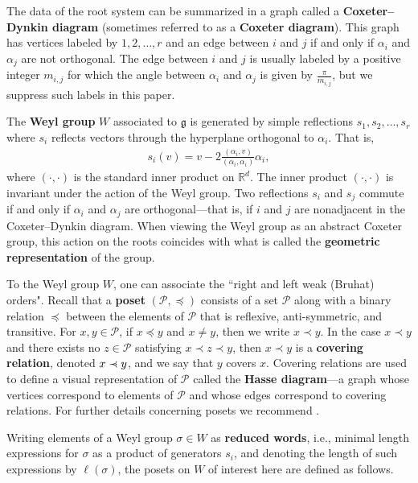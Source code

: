 \documentclass{amsart}
\theoremstyle{definition}
\newcommand*{\R}{\mathbb{R}}
\newcommand{\defn}[1]{\textbf{#1}}
\newcommand{\precdot}{\prec\mathrel{\mkern-5mu}\mathrel{\cdot}}
\begin{document}
The data of the root system can be summarized in a graph called a \defn{Coxeter--Dynkin diagram} (sometimes referred to as a \textbf{Coxeter diagram}). 
This graph has vertices labeled by $1,2,\ldots, r$ and an edge between $i$ and $j$ if and only if $\alpha_i$ and $\alpha_j$ are not orthogonal. The edge between $i$ and $j$ is usually labeled by a positive integer $m_{i,j}$ for which the angle between $\alpha_i$ and $\alpha_j$ is given by $\frac{\pi}{m_{i,j}}$, but we suppress such labels in this paper.

The \textbf{Weyl group} $W$ associated to $\mathfrak{g}$ is generated by simple reflections $s_1, s_2,\ldots,s_r$ where $s_i$ reflects vectors through the hyperplane orthogonal to $\alpha_i$. 
That is, \begin{align*}
    s_i(v)=v-2\frac{(\alpha_i,v)}{(\alpha_i,\alpha_i)}\alpha_i,
\end{align*} where $(\cdot,\cdot)$ is the standard inner product on $\R^d$. 
The inner product $(\cdot,\cdot)$ is invariant under the action of the Weyl group.
Two reflections $s_i$ and $s_j$ commute if and only if $\alpha_i$ and $\alpha_j$ are orthogonal---that is, if $i$ and $j$ are nonadjacent in the Coxeter--Dynkin diagram. 
When viewing the Weyl group as an abstract Coxeter group, this action on the roots coincides with what is called the \defn{geometric representation} of the group. 


To the Weyl group $W$, one can associate the ``right and left weak (Bruhat) orders".
Recall that a \defn{poset} $(\mathcal{P},\preceq)$ consists of a set $\mathcal{P}$ along with a binary relation $\preceq$ between the elements of $\mathcal{P}$ that is 
reflexive, anti-symmetric, and transitive. 
For $x,y\in\mathcal{P}$, if $x\preceq y$ and $x\neq y$, then we write $x\prec y$. 
In the case $x\prec y$ and there exists no $z\in \mathcal{P}$ satisfying $x\prec z\prec y$, then $x\prec y$ is a \defn{covering relation}, denoted $x\precdot y$, and we say that $y$ covers $x$. Covering relations are used to define a visual representation of $\mathcal{P}$ called the \defn{Hasse diagram}---a graph whose vertices correspond to elements of $\mathcal{P}$ and whose edges correspond to covering relations. For further details concerning posets we recommend \cite{EC1}. 

Writing elements of a Weyl group $\sigma\in W$ as \defn{reduced words}, i.e., minimal length expressions for $\sigma$ as a product of generators $s_i$, and denoting the length of such expressions by $\ell(\sigma)$, the posets on $W$ of interest here are defined as follows.
\end{document}
